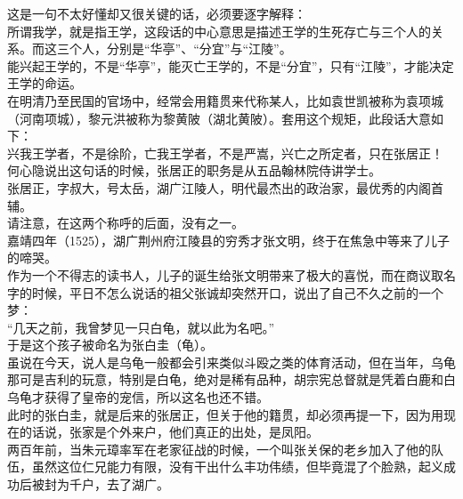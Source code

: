 \begin{multicols}{\theparacolNo}
这是一句不太好懂却又很关键的话，必须要逐字解释：\\

所谓我学，就是指王学，这段话的中心意思是描述王学的生死存亡与三个人的关系。而这三个人，分别是“华亭”、“分宜”与“江陵”。\\

能兴起王学的，不是“华亭”，能灭亡王学的，不是“分宜”，只有“江陵”，才能决定王学的命运。\\

在明清乃至民国的官场中，经常会用籍贯来代称某人，比如袁世凯被称为袁项城（河南项城），黎元洪被称为黎黄陂（湖北黄陂）。套用这个规矩，此段话大意如下：\\

兴我王学者，不是徐阶，亡我王学者，不是严嵩，兴亡之所定者，只在张居正！\\

何心隐说出这句话的时候，张居正的职务是从五品翰林院侍讲学士。\\

张居正，字叔大，号太岳，湖广江陵人，明代最杰出的政治家，最优秀的内阁首辅。\\

请注意，在这两个称呼的后面，没有之一。\\

嘉靖四年（1525），湖广荆州府江陵县的穷秀才张文明，终于在焦急中等来了儿子的啼哭。\\

作为一个不得志的读书人，儿子的诞生给张文明带来了极大的喜悦，而在商议取名字的时候，平日不怎么说话的祖父张诚却突然开口，说出了自己不久之前的一个梦：\\

“几天之前，我曾梦见一只白龟，就以此为名吧。”\\

于是这个孩子被命名为张白圭（龟）。\\

虽说在今天，说人是乌龟一般都会引来类似斗殴之类的体育活动，但在当年，乌龟那可是吉利的玩意，特别是白龟，绝对是稀有品种，胡宗宪总督就是凭着白鹿和白乌龟才获得了皇帝的宠信，所以这名也还不错。\\

此时的张白圭，就是后来的张居正，但关于他的籍贯，却必须再提一下，因为用现在的话说，张家是个外来户，他们真正的出处，是凤阳。\\

两百年前，当朱元璋率军在老家征战的时候，一个叫张关保的老乡加入了他的队伍，虽然这位仁兄能力有限，没有干出什么丰功伟绩，但毕竟混了个脸熟，起义成功后被封为千户，去了湖广。\\


\end{multicols}
